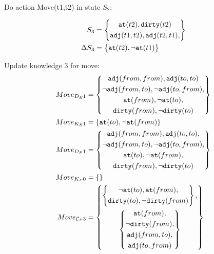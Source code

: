 \documentclass[\master/Master.tex]{subfiles}
\begin{document}
Do action Move(t1,t2) in state $S_2$:

\begin{align*}
	S_3 &= \left\{
	\begin{gathered}
		\texttt{at}(t2),\texttt{dirty}(t2) \\
		\texttt{adj}(t1,t2), \texttt{adj}(t2,t1), \\
	\end{gathered}
	\right\}\\
	\Delta S_3 &= \left\{
	\begin{gathered}
		\texttt{at}(t2), \neg \texttt{at}(t1)
	\end{gathered}
	\right\}\\ 
\end{align*}

Update knowledge 3 for move:
\begin{align*}
	Move_{D_E1} &=\left\{
	\begin{gathered}
		\texttt{adj}(from,from), \texttt{adj}(to,to) \\
		\neg \texttt{adj}(from,to), \neg \texttt{adj}(to,from), \\					
		\texttt{at}(from), \neg \texttt{at}(to), \\					
		\texttt{dirty}(from), \neg \texttt{dirty}(to) \\
	\end{gathered}
	\right\} \\
	Move_{K_E1} &=\{ \texttt{at}(to), \neg \texttt{at}(from)\} \\	
	Move_{D_P1} &=\left\{
	\begin{gathered}
		\texttt{adj}(from,from), \texttt{adj}(to,to), \\
		\neg \texttt{adj}(from,to), \neg \texttt{adj}(to,from), \\					
		\texttt{at}(to), \neg \texttt{at}(from), \\					
		\texttt{dirty}(from), \neg \texttt{dirty}(to) \\
	\end{gathered}
	\right\} \\
	Move_{K_P0} &=\{\} \\
	Move_{\mathcal{C}_P3}& =\left\{
	\begin{gathered}
		\left\{
		\begin{gathered}
			\neg \texttt{at}(to), \texttt{at}(from), \\
			\texttt{dirty}(to), \neg \texttt{dirty}(from) \\
		\end{gathered}
		\right\},\\
		\left\{
		\begin{gathered}
			\texttt{at}(from), \\
			\neg \texttt{dirty}(from), \\
			\texttt{adj}(from,to),   \\
			\texttt{adj}(to,from)
		\end{gathered}
		\right\}\\
	\end{gathered}
	\right\} \\   	
\end{align*}  
\end{document}
